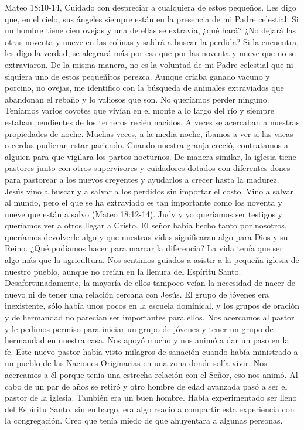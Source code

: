 \documentclass[twoside, 12pt]{book}
\begin{document}
Mateo 18:10-14, Cuidado con despreciar a cualquiera de estos pequeños. Les digo que, en el cielo, sus ángeles siempre están en la presencia de mi Padre celestial. Si un hombre tiene cien ovejas y una de ellas se extravía, ¿qué hará? ¿No dejará las otras noventa y nueve en las colinas y saldrá a buscar la perdida? Si la encuentra, les digo la verdad, se alegrará más por esa que por las noventa y nueve que no se extraviaron. De la misma manera, no es la voluntad de mi Padre celestial que ni siquiera uno de estos pequeñitos perezca.
Aunque criaba ganado vacuno y porcino, no ovejas, me identifico con la búsqueda de animales extraviados que abandonan el rebaño y lo valiosos que son. No queríamos perder ninguno. Teníamos varios coyotes que vivían en el monte a lo largo del río y siempre estaban pendientes de los terneros recién nacidos. A veces se acercaban a nuestras propiedades de noche. Muchas veces, a la media noche, íbamos a ver si las vacas o cerdas pudieran estar pariendo. Cuando nuestra granja creció, contratamos a alguien para que vigilara los partos nocturnos. De manera similar, la iglesia tiene pastores junto con otros supervisores y cuidadores dotados con diferentes dones para pastorear a los nuevos creyentes y ayudarlos a crecer hasta la madurez.\\

Jesús vino a buscar y a salvar a los perdidos sin importar el costo. Vino a salvar al mundo, pero el que se ha extraviado es tan importante como los noventa y nueve que están a salvo (Mateo 18:12-14). Judy y yo queríamos ser testigos y queríamos ver a otros llegar a Cristo. El señor había hecho tanto por nosotros, queríamos devolverle algo y que nuestras vidas significaran algo para Dios y su Reino. ¿Qué podíamos hacer para marcar la diferencia? La vida tenía que ser algo más que la agricultura.
Nos sentimos guiados a asistir a la pequeña iglesia de nuestro pueblo, aunque no creían en la llenura del Espíritu Santo. Desafortunadamente, la mayoría de ellos tampoco veían la necesidad de nacer de nuevo ni de tener una relación cercana con Jesús. El grupo de jóvenes era inexistente, sólo había unos pocos en la escuela dominical, y los grupos de oración y de hermandad no parecían ser importantes para ellos. Nos acercamos al pastor y le pedimos permiso para iniciar un grupo de jóvenes y tener un grupo de hermandad en nuestra casa. Nos apoyó mucho y nos animó a dar un paso en la fe. Este nuevo pastor había visto milagros de sanación cuando había ministrado a un pueblo de las Naciones Originarias en una zona donde solía vivir. Nos acercamos a él porque tenía una estrecha relación con el Señor, eso nos animó. Al cabo de un par de años se retiró y otro hombre de edad avanzada pasó a ser el pastor de la iglesia. También era un buen hombre. Había experimentado ser lleno del Espíritu Santo, sin embargo, era algo reacio a compartir esta experiencia con la congregación. Creo que tenía miedo de que ahuyentara a algunas personas.\\
\end{document}
